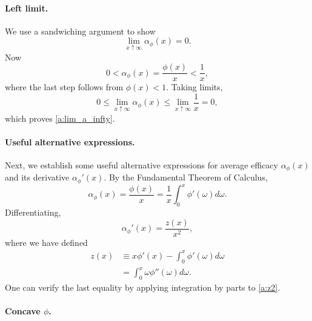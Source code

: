\documentclass[12pt]{article}
\newcommand{\efficacy}{\phi}
\newcommand{\perunit}[1]{\alpha_{#1}}
\begin{document}
\paragraph{Left limit.} 

We use a sandwiching argument to show 
\begin{equation}
\label{a:lim_a_infty}
\lim_{x \uparrow \infty} \perunit{\efficacy} \!(x) = 0.
\end{equation}
Now
\begin{equation}
\label{a:sandwich1}
0 < \perunit{\efficacy}\!(x) = \frac{\efficacy(x)}{x} < \frac{1}{x},
\end{equation}
where the last step follows from $\efficacy(x) < 1$. Taking limits,
\begin{equation}
\label{a:sandwich_limits1}
0 \leq \lim_{x \uparrow \infty} \perunit{\efficacy}\!(x) \leq \lim_{x
  \uparrow \infty} \frac{1}{x} = 0,
\end{equation}
which proves \eqref{a:lim_a_infty}. 

\paragraph{Useful alternative expressions.} 

Next, we establish some useful alternative expressions for average
efficacy $\perunit{\efficacy}\!(x)$ and its derivative
$\perunit{\efficacy}'\!(x)$. By the Fundamental Theorem of Calculus,
\begin{equation}
\label{a:FTCaverage}
\perunit{\efficacy}\!(x) = \frac{\efficacy(x)}{x} = \frac{1}{x}
\int_0^x \efficacy'(\omega) d\omega.
\end{equation}
Differentiating, 
\begin{equation}
\label{a:perunit_prime}
\perunit{\efficacy}'\!(x) =\frac{z(x)}{x^2}, 
\end{equation}
where we have defined
\begin{align} 
z(x) & \equiv x \efficacy'(x) - \int_0^x \efficacy'(\omega) d\omega \label{a:z1} \\
& = \int_0^x \omega \efficacy''(\omega) d\omega. \label{a:z2}
\end{align}
One can verify the last equality by applying integration by parts to \eqref{a:z2}.

\paragraph{Concave $\efficacy$.} 
\end{document}
